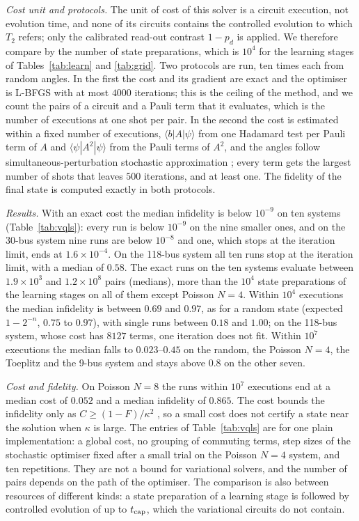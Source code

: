 \documentclass[journal]{IEEEtran}
\begin{document}
\emph{Cost unit and protocols.} The unit of cost of this solver is a circuit execution, not evolution time, and none of its circuits contains the controlled evolution to which $T_2$ refers; only the calibrated read-out contrast $1-p_d$ is applied. We therefore compare by the number of state preparations, which is $10^4$ for the learning stages of Tables~\ref{tab:learn} and \ref{tab:grid}. Two protocols are run, ten times each from random angles. In the first the cost and its gradient are exact and the optimiser is L-BFGS with at most $4000$ iterations; this is the ceiling of the method, and we count the pairs of a circuit and a Pauli term that it evaluates, which is the number of executions at one shot per pair. In the second the cost is estimated within a fixed number of executions, $\langle b|A|\psi\rangle$ from one Hadamard test per Pauli term of $A$ and $\langle\psi|A^2|\psi\rangle$ from the Pauli terms of $A^2$, and the angles follow simultaneous-perturbation stochastic approximation \cite{Spall1992}; every term gets the largest number of shots that leaves $500$ iterations, and at least one. The fidelity of the final state is computed exactly in both protocols.

\emph{Results.} With an exact cost the median infidelity is below $10^{-9}$ on ten systems (Table~\ref{tab:vqls}): every run is below $10^{-9}$ on the nine smaller ones, and on the 30-bus system nine runs are below $10^{-8}$ and one, which stops at the iteration limit, ends at $1.6\times10^{-4}$. On the 118-bus system all ten runs stop at the iteration limit, with a median of $0.58$. The exact runs on the ten systems evaluate between $1.9\times10^3$ and $1.2\times10^8$ pairs (medians), more than the $10^4$ state preparations of the learning stages on all of them except Poisson $N=4$. Within $10^4$ executions the median infidelity is between $0.69$ and $0.97$, as for a random state (expected $1-2^{-n}$, $0.75$ to $0.97$), with single runs between $0.18$ and $1.00$; on the 118-bus system, whose cost has $8127$ terms, one iteration does not fit. Within $10^7$ executions the median falls to $0.023$--$0.45$ on the random, the Poisson $N=4$, the Toeplitz and the 9-bus system and stays above $0.8$ on the other seven.

\emph{Cost and fidelity.} On Poisson $N=8$ the runs within $10^7$ executions end at a median cost of $0.052$ and a median infidelity of $0.865$. The cost bounds the infidelity only as $C\ge(1-F)/\kappa^2$ \cite{BravoPrieto2023}, so a small cost does not certify a state near the solution when $\kappa$ is large. The entries of Table~\ref{tab:vqls} are for one plain implementation: a global cost, no grouping of commuting terms, step sizes of the stochastic optimiser fixed after a small trial on the Poisson $N=4$ system, and ten repetitions. They are not a bound for variational solvers, and the number of pairs depends on the path of the optimiser. The comparison is also between resources of different kinds: a state preparation of a learning stage is followed by controlled evolution of up to $t_{\rm cap}$, which the variational circuits do not contain.
\end{document}
